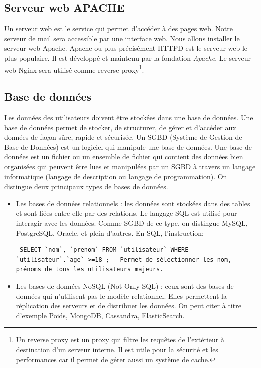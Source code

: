 \documentclass[a4paper,12pt,french]{report} %
\begin{document}
\subsection{Serveur web APACHE}
Un serveur web est le service qui permet d'accéder à des pages web. Notre serveur de mail sera accessible par une interface web. Nous allons installer le serveur web Apache. Apache ou plus précisément HTTPD est le serveur web le plus populaire. Il est développé et maintenu par la fondation \emph{Apache}. Le serveur web Nginx sera utilisé comme reverse proxy\footnote{Un reverse proxy est un proxy qui filtre les requêtes de l'extérieur à destination d'un serveur interne. Il est utile pour la sécurité et les performances car il permet de gérer aussi un système de cache.}.

\subsection{Base de données}
Les données des utilisateurs doivent être stockées dans une base de données. Une base de données permet de stocker, de structurer, de gérer et d'accéder aux données de façon sûre, rapide et sécurisée. Un SGBD (Système de Gestion de Base de Données) est un logiciel qui manipule une base de données. Une base de données est un fichier ou un ensemble de fichier qui contient des données bien organisées qui peuvent être lues et manipulées par un SGBD à travers un langage informatique (langage de description ou langage de programmation). On distingue deux principaux types de bases de données.
 \begin{itemize}
 \item Les bases de données relationnels : les données sont stockées dans des tables et sont liées entre elle par des relations. Le langage SQL est utilisé pour interagir avec les données. Comme SGBD de ce type, on distingue MySQL, PostgreSQL, Oracle, et plein d'autres. En SQL, l'instruction: 
 \begin{verbatim}
 SELECT `nom`, `prenom` FROM `utilisateur` WHERE `utilisateur`.`age` >=18 ; --Permet de sélectionner les nom, prénoms de tous les utilisateurs majeurs.
 \end{verbatim}
 \item Les bases de données NoSQL (Not Only SQL) : ceux sont des bases de données qui n'utilisent pas le modèle relationnel. Elles permettent la réplication des serveurs et de distribuer les données. On  peut citer à titre d'exemple Poids, MongoDB, Cassandra, ElasticSearch.
 \end{itemize}
 
\end{document}
